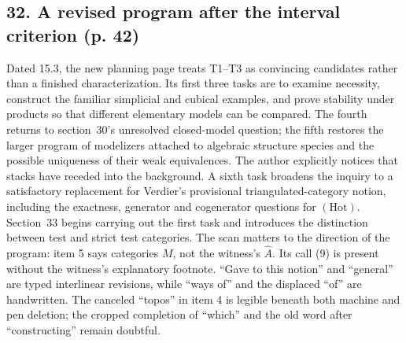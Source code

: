 \subsection*{32. A revised program after the interval criterion (p. 42)}
Dated 15.3, the new planning page treats T1--T3 as convincing candidates rather than a finished characterization. Its first three tasks are to examine necessity, construct the familiar simplicial and cubical examples, and prove stability under products so that different elementary models can be compared. The fourth returns to section~30's unresolved closed-model question; the fifth restores the larger program of modelizers attached to algebraic structure species and the possible uniqueness of their weak equivalences. The author explicitly notices that stacks have receded into the background. A sixth task broadens the inquiry to a satisfactory replacement for Verdier's provisional triangulated-category notion, including the exactness, generator and cogenerator questions for $(\mathrm{Hot})$. Section~33 begins carrying out the first task and introduces the distinction between test and strict test categories. The scan matters to the direction of the program: item 5 says categories $M$, not the witness's $\widehat A$. Its call (9) is present without the witness's explanatory footnote. ``Gave to this notion'' and ``general'' are typed interlinear revisions, while ``ways of'' and the displaced ``of'' are handwritten. The canceled ``topos'' in item 4 is legible beneath both machine and pen deletion; the cropped completion of ``which'' and the old word after ``constructing'' remain doubtful.

